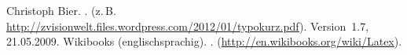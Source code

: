 \begin{thebibliography}{Wikibooks}
	
%
	Christoph Bier.
	.
	\newblock (z.\,B. \url{http://zvisionwelt.files.wordpress.com/2012/01/typokurz.pdf}).
	\newblock Version~1.7, 21.05.2009.
%
	Wikibooks (englischsprachig).
	\newblock {\itshape  \LaTeX{}}.
	\newblock (\url{http://en.wikibooks.org/wiki/Latex}).
%
\end{thebibliography}